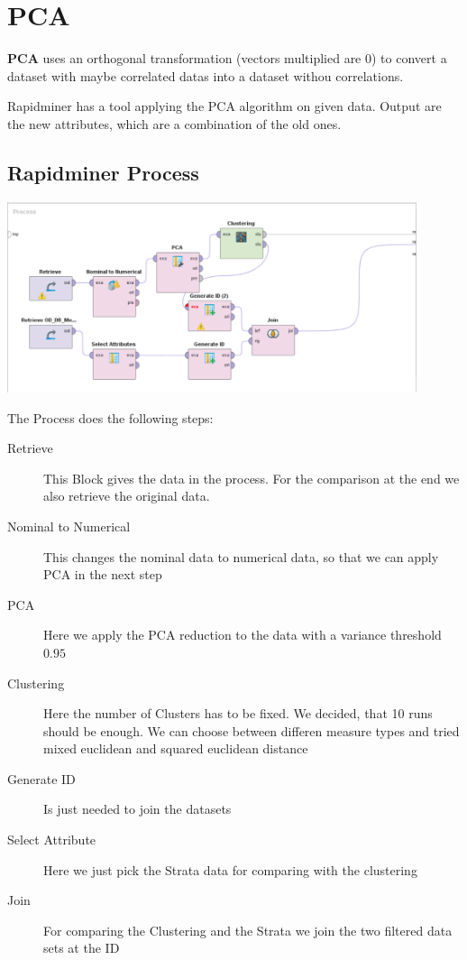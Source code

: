 \section{PCA}

\textbf{PCA} uses an orthogonal transformation (vectors multiplied are 0) to
convert a dataset with maybe correlated datas into a dataset withou
correlations.

Rapidminer has a tool applying the PCA algorithm on given data. Output are the
new attributes, which are a combination of the old ones. 

\subsection{Rapidminer Process}
\includegraphics[width=0.9\textwidth]{PCAClustering}

The Process does the following steps:
\begin{description}
	\item[Retrieve] This Block gives the data in the process. For the comparison at the end we also retrieve the original data.
	\item[Nominal to Numerical] This changes the nominal data to numerical data, so that we can apply PCA in the next step
	\item[PCA] Here we apply the PCA reduction to the data with a variance threshold $0.95$
	\item[Clustering] Here the number of Clusters has to be fixed. We decided, that 10 runs should be enough. We can choose between differen measure types and tried mixed euclidean and squared euclidean distance
	\item[Generate ID] Is just needed to join the datasets 
	\item[Select Attribute] Here we just pick the Strata data for comparing with the clustering
	\item[Join] For comparing the Clustering and the Strata we join the two filtered data sets at the ID
\end{description}

